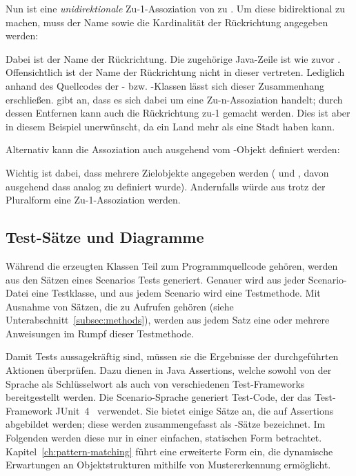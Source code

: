 Nun ist  eine \emph{unidirektionale} Zu-1-Assoziation von  zu .
Um diese bidirektional zu machen, muss der Name sowie die Kardinalität der Rückrichtung angegeben werden:


Dabei ist  der Name der Rückrichtung.
Die zugehörige Java-Zeile ist wie zuvor .
Offensichtlich ist der Name der Rückrichtung nicht in dieser vertreten.
Lediglich anhand des Quellcodes der - bzw. -Klassen lässt sich dieser Zusammenhang erschließen.
 gibt an, dass es sich dabei um eine Zu-n-Assoziation handelt;
durch dessen Entfernen kann auch die Rückrichtung zu-1 gemacht werden.
Dies ist aber in diesem Beispiel unerwünscht, da ein Land mehr als eine Stadt haben kann.

Alternativ kann die Assoziation auch ausgehend vom -Objekt definiert werden:


Wichtig ist dabei, dass mehrere Zielobjekte angegeben werden ( und , davon ausgehend dass  analog zu  definiert wurde).
Andernfalls würde aus  trotz der Pluralform eine Zu-1-Assoziation werden.

\subsection{Test-Sätze und Diagramme}\label{subsec:test-sentences-and-diagrams}

Während die erzeugten Klassen Teil zum Programmquellcode gehören,
werden aus den Sätzen eines Scenarios Tests generiert.
Genauer wird aus jeder Scenario-Datei eine Testklasse,
und aus jedem Scenario wird eine Testmethode.
Mit Ausnahme von Sätzen, die zu Aufrufen gehören (siehe Unterabschnitt~\ref{subsec:methods}),
werden aus jedem Satz eine oder mehrere Anweisungen im Rumpf dieser Testmethode.

Damit Tests aussagekräftig sind, müssen sie die Ergebnisse der durchgeführten Aktionen überprüfen.
Dazu dienen in Java Assertions, welche sowohl von der Sprache als Schlüsselwort als auch von verschiedenen Test-Frameworks bereitgestellt werden.
Die Scenario-Sprache generiert Test-Code, der das Test-Framework JUnit~4~\cite{junit4} verwendet.
Sie bietet einige Sätze an, die auf Assertions abgebildet werden;
diese werden zusammengefasst als -Sätze bezeichnet.
Im Folgenden werden diese nur in einer einfachen, statischen Form betrachtet.
Kapitel~\ref{ch:pattern-matching} führt eine erweiterte Form ein, die dynamische Erwartungen an Objektstrukturen mithilfe von Mustererkennung ermöglicht.

